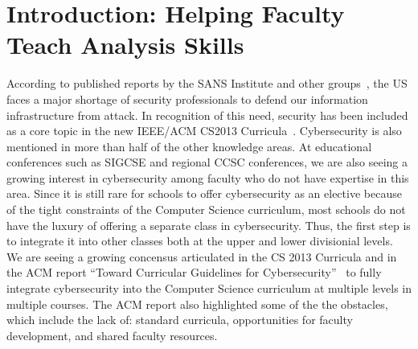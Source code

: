 

%


\section{Introduction: Helping Faculty Teach Analysis Skills}
\label{sec:intro}

According to published reports by the SANS Institute and other 
groups~\cite{defensenewsshortage}, the US faces a major shortage of 
security professionals to defend our information infrastructure from
attack.  In recognition of this need, security has been included as
a core topic in the new 
IEEE/ACM CS2013 Curricula~\cite{IEEE_CS_2013}.   Cybersecurity is also mentioned
in more than half of the other knowledge areas.  At educational conferences such
as SIGCSE and regional CCSC conferences, we are also seeing a growing interest 
in cybersecurity among faculty who do not have expertise in this area.
Since it is still rare for schools to offer cybersecurity as an elective
because of the tight 
constraints of the Computer Science curriculum, most schools 
do not have the luxury of offering a separate class in cybersecurity.
  Thus, 
the first step is to integrate it into other classes both at the upper and lower divisionial
levels.  We are seeing a growing concensus articulated in the CS 2013 Curricula and
in the  ACM report ``Toward Curricular Guidelines for Cybersecurity''~\cite{ACM_cyber_2013}
to fully integrate cybersecurity into the Computer Science curriculum at multiple levels
in multiple courses.
The ACM report also highlighted some of the the obstacles, which include the lack of:
standard curricula,
opportunities for faculty development,  
and shared faculty resources.

